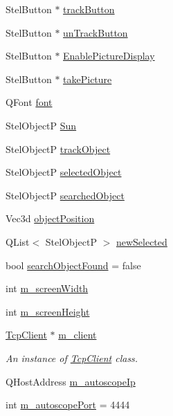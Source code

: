 \begin{DoxyCompactItemize}
\item 
Stel\+Button $\ast$ \mbox{\hyperlink{class_autoscope_a816e3212639b4204e9917704e02b0d09}{track\+Button}}
\item 
Stel\+Button $\ast$ \mbox{\hyperlink{class_autoscope_a5d3be6a8522dc18b921936b57c8e661c}{un\+Track\+Button}}
\item 
Stel\+Button $\ast$ \mbox{\hyperlink{class_autoscope_aa3b4663ded25875ce8fb21906b38d174}{Enable\+Picture\+Display}}
\item 
Stel\+Button $\ast$ \mbox{\hyperlink{class_autoscope_a8f64e1d50e979751403a70008f0d01da}{take\+Picture}}
\item 
Q\+Font \mbox{\hyperlink{class_autoscope_a168d6d47f412a7966c2f5ddeb0f4cc79}{font}}
\item 
Stel\+ObjectP \mbox{\hyperlink{class_autoscope_a5bcfda333996f4fc3a959306be3e3d07}{Sun}}
\item 
Stel\+ObjectP \mbox{\hyperlink{class_autoscope_a170fbbc7b2a719517912aa3614727021}{track\+Object}}
\item 
Stel\+ObjectP \mbox{\hyperlink{class_autoscope_a954a97691346ff2fb0981877554c1ac3}{selected\+Object}}
\item 
Stel\+ObjectP \mbox{\hyperlink{class_autoscope_aba59abee95b4b5443709dce1d61a3498}{searched\+Object}}
\item 
Vec3d \mbox{\hyperlink{class_autoscope_aff4d8365cc96689c79f3370ebde45b9e}{object\+Position}}
\item 
Q\+List$<$ Stel\+ObjectP $>$ \mbox{\hyperlink{class_autoscope_aa02f096fc07e27ef3843eb4f8ba2c5a5}{new\+Selected}}
\item 
bool \mbox{\hyperlink{class_autoscope_adcd9ee42b339c3c526231ed97c0ef6fa}{search\+Object\+Found}} = false
\item 
int \mbox{\hyperlink{class_autoscope_afe92778dfed037b0ec41ad51f8086a56}{m\+\_\+screen\+Width}}
\item 
int \mbox{\hyperlink{class_autoscope_a003c73a069f579f831eeaa8f04cf2977}{m\+\_\+screen\+Height}}
\item 
\mbox{\hyperlink{class_tcp_client}{Tcp\+Client}} $\ast$ \mbox{\hyperlink{class_autoscope_af6e7a8d7cf7014e9b0f9296e2b7d7fd5}{m\+\_\+client}}
\begin{DoxyCompactList}\small\item\em An instance of \mbox{\hyperlink{class_tcp_client}{Tcp\+Client}} class. \end{DoxyCompactList}\item 
Q\+Host\+Address \mbox{\hyperlink{class_autoscope_aa3c1b8d19881d76c680b8c4ea1692c89}{m\+\_\+autoscope\+Ip}}
\item 
int \mbox{\hyperlink{class_autoscope_abb67968cc6c6678995512aa1a05ad0e1}{m\+\_\+autoscope\+Port}} = 4444
\end{DoxyCompactItemize}


